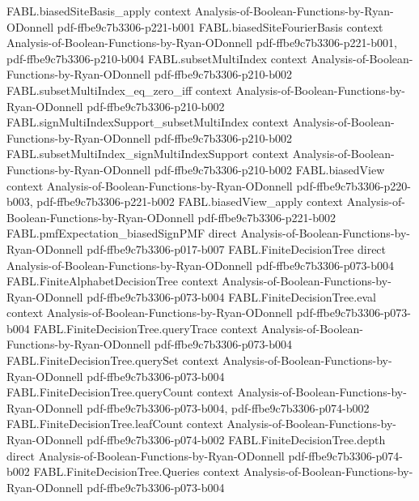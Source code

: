 \begin{theorem}
  {FABL.biasedSiteBasis_apply}
  {context}
  {Analysis-of-Boolean-Functions-by-Ryan-ODonnell}
  {pdf-ffbe9c7b3306-p221-b001}
\proofstep
  {FABL.biasedSiteFourierBasis}
  {context}
  {Analysis-of-Boolean-Functions-by-Ryan-ODonnell}
  {pdf-ffbe9c7b3306-p221-b001,
    pdf-ffbe9c7b3306-p210-b004}
\proofstep
  {FABL.subsetMultiIndex}
  {context}
  {Analysis-of-Boolean-Functions-by-Ryan-ODonnell}
  {pdf-ffbe9c7b3306-p210-b002}
\proofstep
  {FABL.subsetMultiIndex_eq_zero_iff}
  {context}
  {Analysis-of-Boolean-Functions-by-Ryan-ODonnell}
  {pdf-ffbe9c7b3306-p210-b002}
\proofstep
  {FABL.signMultiIndexSupport_subsetMultiIndex}
  {context}
  {Analysis-of-Boolean-Functions-by-Ryan-ODonnell}
  {pdf-ffbe9c7b3306-p210-b002}
\proofstep
  {FABL.subsetMultiIndex_signMultiIndexSupport}
  {context}
  {Analysis-of-Boolean-Functions-by-Ryan-ODonnell}
  {pdf-ffbe9c7b3306-p210-b002}
\proofstep
  {FABL.biasedView}
  {context}
  {Analysis-of-Boolean-Functions-by-Ryan-ODonnell}
  {pdf-ffbe9c7b3306-p220-b003,
    pdf-ffbe9c7b3306-p221-b002}
\proofstep
  {FABL.biasedView_apply}
  {context}
  {Analysis-of-Boolean-Functions-by-Ryan-ODonnell}
  {pdf-ffbe9c7b3306-p221-b002}
\proofstep
  {FABL.pmfExpectation_biasedSignPMF}
  {direct}
  {Analysis-of-Boolean-Functions-by-Ryan-ODonnell}
  {pdf-ffbe9c7b3306-p017-b007}
\proofstep
  {FABL.FiniteDecisionTree}
  {direct}
  {Analysis-of-Boolean-Functions-by-Ryan-ODonnell}
  {pdf-ffbe9c7b3306-p073-b004}
\proofstep
  {FABL.FiniteAlphabetDecisionTree}
  {context}
  {Analysis-of-Boolean-Functions-by-Ryan-ODonnell}
  {pdf-ffbe9c7b3306-p073-b004}
\proofstep
  {FABL.FiniteDecisionTree.eval}
  {context}
  {Analysis-of-Boolean-Functions-by-Ryan-ODonnell}
  {pdf-ffbe9c7b3306-p073-b004}
\proofstep
  {FABL.FiniteDecisionTree.queryTrace}
  {context}
  {Analysis-of-Boolean-Functions-by-Ryan-ODonnell}
  {pdf-ffbe9c7b3306-p073-b004}
\proofstep
  {FABL.FiniteDecisionTree.querySet}
  {context}
  {Analysis-of-Boolean-Functions-by-Ryan-ODonnell}
  {pdf-ffbe9c7b3306-p073-b004}
\proofstep
  {FABL.FiniteDecisionTree.queryCount}
  {context}
  {Analysis-of-Boolean-Functions-by-Ryan-ODonnell}
  {pdf-ffbe9c7b3306-p073-b004,
    pdf-ffbe9c7b3306-p074-b002}
\proofstep
  {FABL.FiniteDecisionTree.leafCount}
  {context}
  {Analysis-of-Boolean-Functions-by-Ryan-ODonnell}
  {pdf-ffbe9c7b3306-p074-b002}
\proofstep
  {FABL.FiniteDecisionTree.depth}
  {direct}
  {Analysis-of-Boolean-Functions-by-Ryan-ODonnell}
  {pdf-ffbe9c7b3306-p074-b002}
\proofstep
  {FABL.FiniteDecisionTree.Queries}
  {context}
  {Analysis-of-Boolean-Functions-by-Ryan-ODonnell}
  {pdf-ffbe9c7b3306-p073-b004}
\proofstep

\end{theorem}
